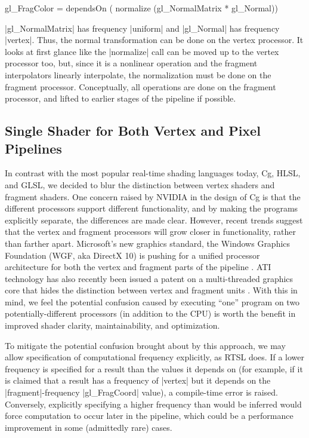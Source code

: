 \documentclass{acmsiggraph}               %
\begin{document}
\begin{MyVerb}
gl_FragColor = dependsOn (
    normalize (gl_NormalMatrix * gl_Normal))
\end{MyVerb}

|gl_NormalMatrix| has frequency |uniform| and |gl_Normal| has
frequency |vertex|.  Thus, the normal transformation can be done on
the vertex processor.  It looks at first glance like the |normalize|
call can be moved up to the vertex processor too, but, since it is a
nonlinear operation and the fragment interpolators linearly
interpolate, the normalization must be done on the fragment processor.
Conceptually, all operations are done on the fragment processor, and
lifted to earlier stages of the pipeline if possible.


\subsection{Single Shader for Both Vertex and Pixel Pipelines}

In contrast with the most popular real-time shading languages today,
Cg, HLSL, and GLSL, we decided to blur the distinction between vertex
shaders and fragment shaders.  One concern raised by NVIDIA in the
design of Cg is that the different processors support different
functionality, and by making the programs explicitly separate, the
differences are made clear\cite{mark03cg}.  However, recent trends
suggest that the vertex and fragment processors will grow closer in
functionality, rather than farther apart. Microsoft's new graphics
standard, the Windows Graphics Foundation (WGF, aka DirectX 10) is
pushing for a unified processor architecture for both the vertex and
fragment parts of the pipeline \cite{blythewgf}. ATI technology has
also recently been issued a patent on a multi-threaded graphics core
that hides the distinction between vertex and fragment units
\cite{atimtpatent,b3datimtpatent}. With this in mind, we feel the
potential confusion caused by executing ``one'' program on two
potentially-different processors (in addition to the CPU) is worth the
benefit in improved shader clarity, maintainability, and optimization.

To mitigate the potential confusion brought about by this approach, we
may allow specification of computational frequency explicitly, as RTSL
does.  If a lower frequency is specified for a result than the values
it depends on (for example, if it is claimed that a result has a
frequency of |vertex| but it depends on the |fragment|-frequency
|gl_FragCoord| value), a compile-time error is raised.  Conversely,
explicitly specifying a higher frequency than would be inferred would
force computation to occur later in the pipeline, which could be a
performance improvement in some (admittedly rare) cases.
\end{document}

